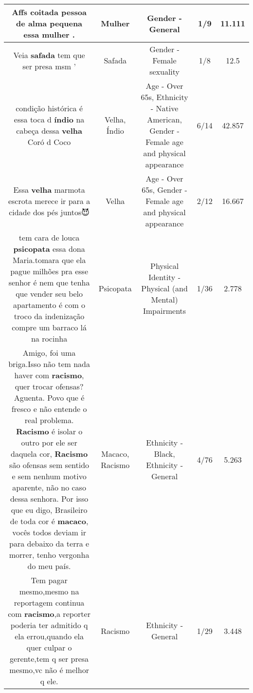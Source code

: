 \documentclass[11pt]{article}
\newlength\mylength
\begin{document}
\begin{center}
\begin{longtable}{|C{.65\mylength}|C{.30\mylength}|C{.12\mylength}|C{.12\mylength}|C{.12\mylength}|}
  \small Affs coitada pessoa de alma  pequena essa \textbf{mulher} .\normalsize   & Mulher & Gender - General & 1/9 & 11.111 \\  \hline
  \small Veia \textbf{safada} tem que ser presa msm '\normalsize   & Safada & Gender - Female sexuality & 1/8 & 12.5 \\  \hline
  \small condição histórica é essa toca d \textbf{índio} na cabeça dessa \textbf{v\textbf{elha}} Coró d Coco\normalsize   & Velha, Índio & Age - Over 65s, Ethnicity - Native American, Gender - Female age and physical appearance & 6/14 & 42.857 \\  \hline
  \small Essa \textbf{v\textbf{elha}} marmota escrota merece ir para a cidade dos pés juntos😈\normalsize   & Velha & Age - Over 65s, Gender - Female age and physical appearance & 2/12 & 16.667 \\  \hline
  \small tem cara de louca \textbf{psicopata} essa dona Maria.tomara que ela pague milhões pra esse senhor é nem que tenha que vender seu belo apartamento é com o troco da indenização compre um barraco lá na rocinha\normalsize   & Psicopata & Physical Identity - Physical (and Mental) Impairments & 1/36 & 2.778 \\  \hline
  \small Amigo, foi uma briga.Isso não tem nada haver com \textbf{racismo}, quer trocar ofensas? Aguenta. Povo que é fresco e não entende o real problema. \textbf{Racismo} é isolar o outro por ele ser daquela cor, \textbf{Racismo} são ofensas sem sentido e sem nenhum motivo aparente, não no caso dessa senhora. Por isso que eu digo, Brasileiro de toda cor é \textbf{macaco}, vocês todos deviam ir para debaixo da terra e morrer, tenho vergonha do meu país.\normalsize   & Macaco, Racismo & Ethnicity - Black, Ethnicity - General & 4/76 & 5.263 \\  \hline
  \small Tem pagar mesmo,mesmo na reportagem continua com \textbf{racismo},a reporter poderia ter admitido q ela errou,quando ela quer culpar o gerente,tem q ser presa mesmo,vc não é melhor q ele.\normalsize   & Racismo & Ethnicity - General & 1/29 & 3.448 \\  \hline

\end{longtable}
\end{center}
\end{document}
